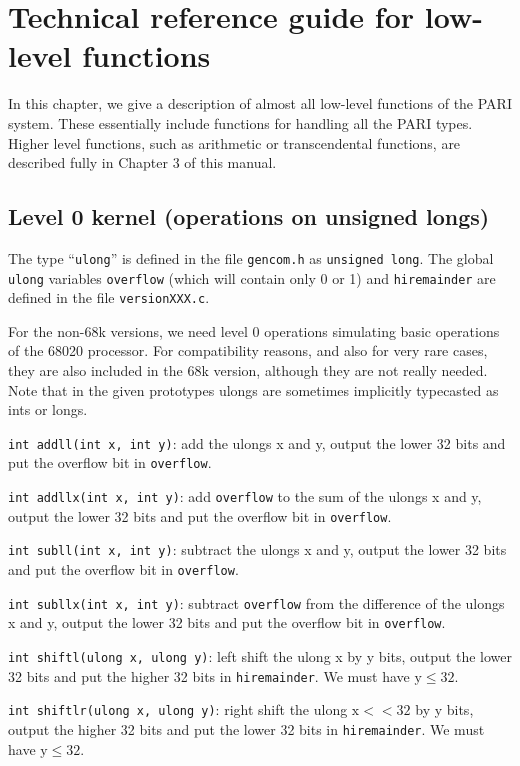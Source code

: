 \chapter{Technical reference guide for low-level functions}

In this chapter, we give a description of almost all low-level functions of
the PARI system. These essentially include functions for handling all the
PARI types. Higher level functions, such as arithmetic or transcendental
functions, are described fully in Chapter 3 of this manual.

\section{Level 0 kernel (operations on unsigned longs)}
The type ``{\tt ulong}'' is defined in the file {\tt gencom.h} as 
{\tt unsigned long}. The global {\tt ulong} variables {\tt overflow} 
(which will contain only 0 or 1) and {\tt hiremainder} are defined in the
file {\tt versionXXX.c}. 

For the non-68k versions, we need level 0 operations simulating basic
operations of the 68020 processor. For compatibility reasons, and also
for very rare cases, they are also included in the 68k version, although
they are not really needed. Note that in the given prototypes ulongs are 
sometimes implicitly typecasted as ints or longs.

{\tt int addll(int x, int y)}: add the ulongs x and y, output the lower 32
bits and put the overflow bit in {\tt overflow}.

{\tt int addllx(int x, int y)}: add {\tt overflow} to the sum of the ulongs x
and y, output the lower 32 bits and put the overflow bit in {\tt overflow}.

{\tt int subll(int x, int y)}: subtract the ulongs x and y, output the lower 
32 bits and put the overflow bit in {\tt overflow}.

{\tt int subllx(int x, int y)}: subtract {\tt overflow} from the difference
of the ulongs x and y, output the lower 32 bits and put the overflow bit in
{\tt overflow}.

{\tt int shiftl(ulong x, ulong y)}: left shift the ulong x by y bits, output
the lower 32 bits and put the higher 32 bits in {\tt hiremainder}. We must
have $\text{y}\le32$.

{\tt int shiftlr(ulong x, ulong y)}: right shift the ulong $\text{x}<<32$ by
y bits, output the higher 32 bits and put the lower 32 bits in 
{\tt hiremainder}. We must have $\text{y}\le32$.

